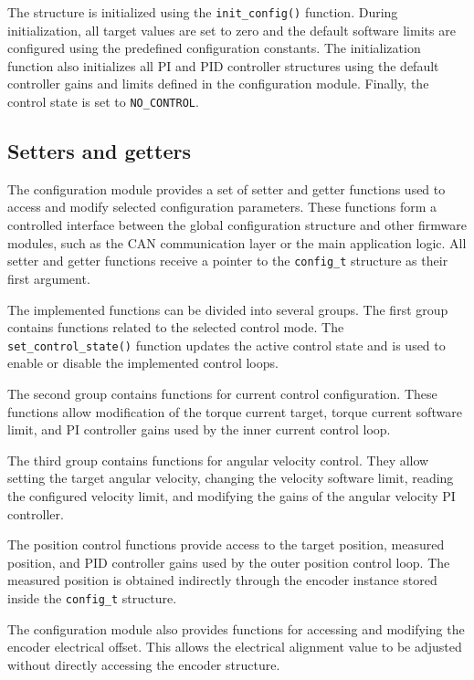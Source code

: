 The structure is initialized using the \texttt{init\_config()} function.
During initialization, all target values are set to zero and the default software limits are configured using the predefined configuration constants.
The initialization function also initializes all PI and PID controller structures using the default controller gains and limits defined in the configuration module.
Finally, the control state is set to \texttt{NO\_CONTROL}.

\subsection{Setters and getters}
The configuration module provides a set of setter and getter functions used to access and modify selected configuration parameters.
These functions form a controlled interface between the global configuration structure and other firmware modules,
such as the CAN communication layer or the main application logic. 
All setter and getter functions receive a pointer to the \texttt{config\_t} structure as their first argument.

The implemented functions can be divided into several groups.
The first group contains functions related to the selected control mode.
The \texttt{set\_control\_state()} function updates the active control state and is used to enable or disable the implemented control loops.

The second group contains functions for current control configuration.
These functions allow modification of the torque current target, torque current software limit,
and PI controller gains used by the inner current control loop.

The third group contains functions for angular velocity control.
They allow setting the target angular velocity, changing the velocity software limit,
reading the configured velocity limit, and modifying the gains of the angular velocity PI controller.

The position control functions provide access to the target position, measured position,
and PID controller gains used by the outer position control loop.
The measured position is obtained indirectly through the encoder instance stored inside the \texttt{config\_t} structure.

The configuration module also provides functions for accessing and modifying the encoder electrical offset.
This allows the electrical alignment value to be adjusted without directly accessing the encoder structure.

